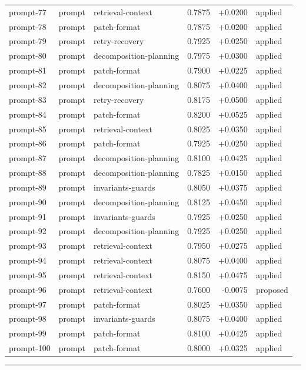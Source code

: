 \begin{center}
\begin{longtable}{llp{5.2cm}rrl}
prompt-77 & prompt & retrieval-context & 0.7875 & +0.0200 & applied \\
prompt-78 & prompt & patch-format & 0.7875 & +0.0200 & applied \\
prompt-79 & prompt & retry-recovery & 0.7925 & +0.0250 & applied \\
prompt-80 & prompt & decomposition-planning & 0.7975 & +0.0300 & applied \\
prompt-81 & prompt & patch-format & 0.7900 & +0.0225 & applied \\
prompt-82 & prompt & decomposition-planning & 0.8075 & +0.0400 & applied \\
prompt-83 & prompt & retry-recovery & 0.8175 & +0.0500 & applied \\
prompt-84 & prompt & patch-format & 0.8200 & +0.0525 & applied \\
prompt-85 & prompt & retrieval-context & 0.8025 & +0.0350 & applied \\
prompt-86 & prompt & patch-format & 0.7925 & +0.0250 & applied \\
prompt-87 & prompt & decomposition-planning & 0.8100 & +0.0425 & applied \\
prompt-88 & prompt & decomposition-planning & 0.7825 & +0.0150 & applied \\
prompt-89 & prompt & invariants-guards & 0.8050 & +0.0375 & applied \\
prompt-90 & prompt & decomposition-planning & 0.8125 & +0.0450 & applied \\
prompt-91 & prompt & invariants-guards & 0.7925 & +0.0250 & applied \\
prompt-92 & prompt & decomposition-planning & 0.7925 & +0.0250 & applied \\
prompt-93 & prompt & retrieval-context & 0.7950 & +0.0275 & applied \\
prompt-94 & prompt & retrieval-context & 0.8075 & +0.0400 & applied \\
prompt-95 & prompt & retrieval-context & 0.8150 & +0.0475 & applied \\
prompt-96 & prompt & retrieval-context & 0.7600 & -0.0075 & proposed \\
prompt-97 & prompt & patch-format & 0.8025 & +0.0350 & applied \\
prompt-98 & prompt & invariants-guards & 0.8075 & +0.0400 & applied \\
prompt-99 & prompt & patch-format & 0.8100 & +0.0425 & applied \\
prompt-100 & prompt & patch-format & 0.8000 & +0.0325 & applied \\
\bottomrule\end{longtable}\end{center}
\par\bigskip\hrule\bigskip
